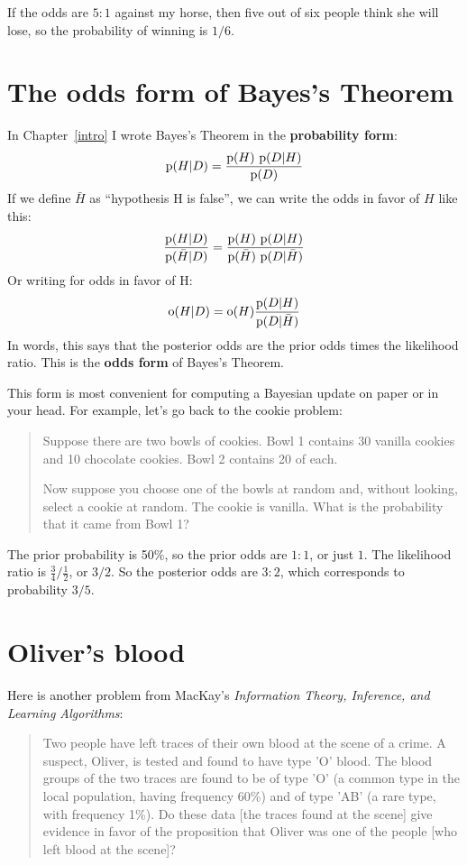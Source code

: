 \documentclass[12pt]{book}
\begin{document}
If the odds are $5:1$ against my horse, then five out of six
people think she will lose, so the probability of winning
is $1/6$.


\section{The odds form of Bayes's Theorem}

In Chapter~\ref{intro} I wrote Bayes's Theorem in the {\bf probability
form}:
%
\[ \mathrm{p}(H|D) = \frac{\mathrm{p}(H)~\mathrm{p}(D|H)}{\mathrm{p}(D)} \]
%
If we define $\bar{H}$ as ``hypothesis H is false'', we can write the
odds in favor of $H$ like this:
%
\[ \frac{\mathrm{p}(H|D)}{\mathrm{p}(\bar{H}|D)} = \frac{\mathrm{p}(H)~\mathrm{p}(D|H)}
                                        {\mathrm{p}(\bar{H})~\mathrm{p}(D|\bar{H})} \]
%
Or writing  for odds in favor of H:
%
\[ \mathrm{o}(H|D) = \mathrm{o}(H) \frac{\mathrm{p}(D|H)}{\mathrm{p}(D|\bar{H})} \]
%
In words, this says that the posterior odds are the prior odds times
the likelihood ratio.  This is the {\bf odds form} of Bayes's Theorem.

This form is most convenient for computing a Bayesian update on
paper or in your head.  For example, let's go back to the
cookie problem:

\begin{quote}
Suppose there are two bowls of cookies.  Bowl 1 contains
  30 vanilla cookies and 10 chocolate cookies.  Bowl 2 contains 20 of
  each.

Now suppose you choose one of the bowls at random and, without looking,
select a cookie at random.  The cookie is vanilla.  What is the probability
that it came from Bowl 1?
\end{quote}

The prior probability is 50\%, so the prior odds are $1:1$, or just
$1$.  The likelihood ratio is $\frac{3}{4} / \frac{1}{2}$, or $3/2$.
So the posterior odds are $3:2$, which corresponds to probability
$3/5$.


\section{Oliver's blood}
\label{oliver}

Here is another problem from MacKay's {\it Information Theory,
  Inference, and Learning Algorithms}:

\begin{quote}
Two people have left traces of their own blood at the scene of
a crime.  A suspect, Oliver, is tested and found to have type
'O' blood.  The blood groups of the two traces are found to
be of type 'O' (a common type in the local population, having frequency
60\%) and of type 'AB' (a rare type, with frequency 1\%).
Do these data [the traces found at the scene] give evidence
in favor of the proposition that Oliver was one of the people
[who left blood at the scene]?
\end{quote}
\end{document}
